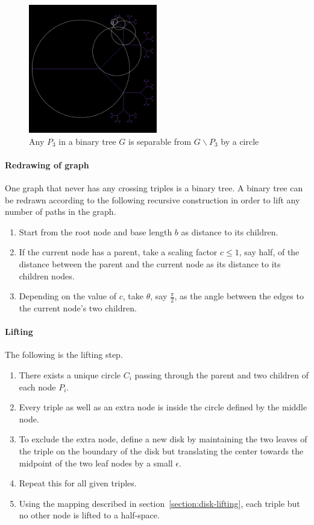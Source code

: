 \documentclass{NSF}
\begin{document}
\begin{figure}[ht]
\centering
\includegraphics[width=0.5\textwidth]{images/binary-tree-with-circles}
\caption{Any $P_3$ in a binary tree $G$ is separable from $G\backslash P_3$ by a circle}
\end{figure}

\paragraph{Redrawing of graph} One graph that never has any crossing triples is a binary tree. A binary tree can be redrawn according to the following recursive construction in order to lift any number of paths in the graph.
\begin{enumerate}
\item Start from the root node and base length $b$ as distance to its children.
\item If the current node has a parent, take a scaling factor $c\leq 1$, say half, of the distance between the parent and the current node as its distance to its children nodes.
\item Depending on the value of $c$, take $\theta$, say $\frac{\pi}{2}$, as the angle between the edges to the current node's two children.
\end{enumerate}

\paragraph{Lifting} The following is the lifting step.
\begin{enumerate}
\item There exists a unique circle $C_i$ passing through the parent and two children of each node $P_i$.
\item Every triple as well as an extra node is inside the circle defined by the middle node.
\item To exclude the extra node, define a new disk by maintaining the two leaves of the triple on the boundary of the disk but translating the center towards the midpoint of the two leaf nodes by a small $\epsilon$.
\item Repeat this for all given triples.
\item Using the mapping described in section~\ref{section:disk-lifting}, each triple but no other node is lifted to a half-space.
\end{enumerate}
\end{document}
